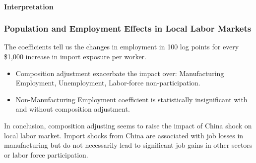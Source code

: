 \begin{frame}
    \framesubtitle{Interpretation}
    
    \frametitle{Population and Employment Effects in Local Labor Markets}
        The coefficients tell us the changes in employment in 100 log points for every \$1,000 increase in import exposure per worker.

        \begin{itemize}
            \item Composition adjustment exacerbate the impact over: Manufacturing Employment, Unemployment, Labor-force non-participation.
            \item Non-Manufacturing Employment coefficient is statistically insignificant with and without composition adjustment.
        \end{itemize}
   
        In conclusion, composition adjusting seems to raise the impact of China shock on local labor market. Import shocks from China are associated with job losses in manufacturing but do not necessarily lead to significant job gains in other sectors or labor force participation.
\end{frame}
